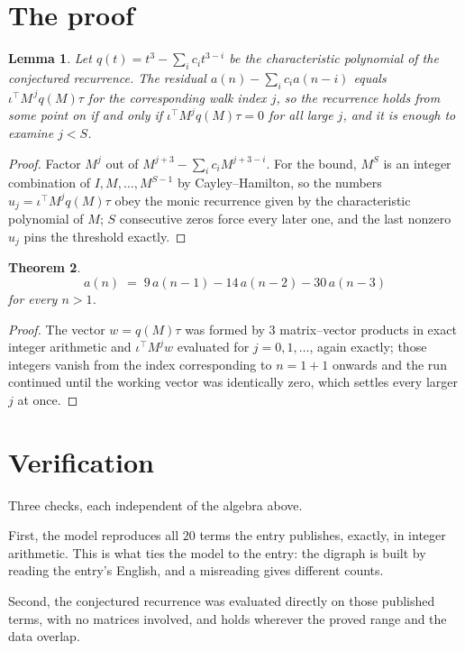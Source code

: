 \documentclass[11pt,a4paper]{article}
\theoremstyle{plain}
\newtheorem{theorem}{Theorem}
\newtheorem{lemma}[theorem]{Lemma}
\theoremstyle{definition}
\begin{document}
\section{The proof}

\begin{lemma}\label{lem:crit}
Let $q(t)=t^{3}-\sum_i c_it^{3-i}$ be the characteristic polynomial of the
conjectured recurrence. The residual $a(n)-\sum_ic_ia(n-i)$ equals
$\iota^{\!\top}M^{\,j}q(M)\tau$ for the corresponding walk index $j$, so the recurrence
holds from some point on if and only if $\iota^{\!\top}M^{j}q(M)\tau=0$ for all large $j$,
and it is enough to examine $j<S$.
\end{lemma}

\begin{proof}
Factor $M^{j}$ out of $M^{j+3}-\sum_ic_iM^{j+3-i}$. For the bound, $M^{S}$
is an integer combination of $I,M,\dots,M^{S-1}$ by Cayley--Hamilton, so the numbers
$u_j=\iota^{\!\top}M^{j}q(M)\tau$ obey the monic recurrence given by the characteristic
polynomial of $M$; $S$ consecutive zeros force every later one, and the last nonzero $u_j$
pins the threshold exactly.
\end{proof}

\begin{theorem}
\[
a(n)\;=\;9\,a(n-1) - 14\,a(n-2) - 30\,a(n-3)
\]
for every $n>1$.
\end{theorem}

\begin{proof}
The vector $w=q(M)\tau$ was formed by $3$ matrix--vector products in exact integer
arithmetic and $\iota^{\!\top}M^{j}w$ evaluated for $j=0,1,\dots$, again exactly; those
integers vanish from the index corresponding to $n=1+1$ onwards and the run continued
until the working vector was identically zero, which settles every larger $j$ at once.
\end{proof}

\section{Verification}

Three checks, each independent of the algebra above.

First, the model reproduces all $20$ terms the entry publishes, exactly, in integer
arithmetic. This is what ties the model to the entry: the digraph is built by reading the
entry's English, and a misreading gives different counts.

Second, the conjectured recurrence was evaluated directly on those published terms, with no
matrices involved, and holds wherever the proved range and the data overlap.
\end{document}
